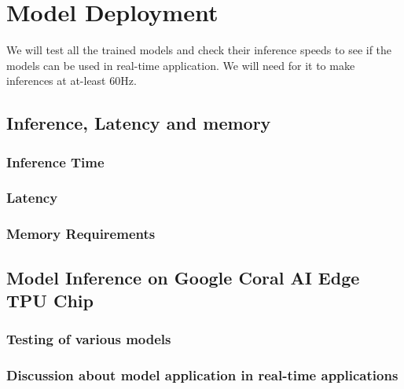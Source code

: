 \chapter{Model Deployment} \label{chapter_five}


We will test all the trained models and check their inference speeds to see if the models can be used in real-time application. We will need for it to make inferences at at-least 60Hz.

\section{Inference, Latency and memory}

\subsection{Inference Time}
\subsection{Latency}
\subsection{Memory Requirements}

\section{Model Inference on Google Coral AI Edge TPU Chip}

\subsection{Testing of various models}

\subsection{Discussion about model application in real-time applications}